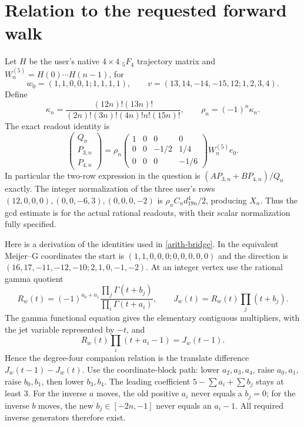 \documentclass[11pt]{article}
\begin{document}
\section{Relation to the requested forward walk}\label{arith-walk-section}
Let $H$ be the user's native $4\times4$ ${}_5F_4$ trajectory matrix and
$W_n^{(5)}=H(0)\cdots H(n-1)$, for
\[
 w_0=(1,1,0,0,1;1,1,1,1),\qquad
 v=(13,14,-14,-15,12;1,2,3,4).
\]
Define
\[
 \kappa_n=\frac{(12n)!(13n)!}
 {(2n)!(3n)!(4n)!n!(15n)!},\qquad \rho_n=(-1)^n\kappa_n.
\]
The exact readout identity is
\begin{equation}\label{arith-bridge}
 \begin{pmatrix}Q_n\\P_{3,n}\\P_{4,n}\end{pmatrix}
 =\rho_n
 \begin{pmatrix}1&0&0&0\\0&0&-1/2&1/4\\0&0&0&-1/6\end{pmatrix}
 W_n^{(5)}e_0.
\end{equation}
In particular the two-row expression in the question is
$(AP_{3,n}+BP_{4,n})/Q_n$ exactly. The integer normalization of the
three user's rows $(12,0,0,0),(0,0,-6,3),(0,0,0,-2)$ is
$\rho_n C_nd_{19n}^4/2$, producing $X_n$.
Thus the gcd estimate is for the actual rational readouts, with their
scalar normalization fully specified.

Here is a derivation of the identities used in \eqref{arith-bridge}. In the
equivalent Meijer--G coordinates the start is
$(1,1,0,0,0;0,0,0,0,0)$ and the direction is
$(16,17,-11,-12,-10;2,1,0,-1,-2)$.
At an integer vertex use the rational gamma quotient
\[
 R_w(t)=(-1)^{a_0+a_1}\frac{\prod_j\Gamma(t+b_j)}{\prod_i\Gamma(t+a_i)},
 \qquad J_w(t)=R_w(t)\prod_j(t+b_j).
\]
The gamma functional equation gives the elementary contiguous
multipliers, with the jet variable represented by $-t$, and
\[
 R_w(t)\prod_i(t+a_i-1)=J_w(t-1).
\]
Hence the degree-four companion relation is the translate difference
$J_w(t-1)-J_w(t)$.
Use the coordinate-block path: lower $a_2,a_3,a_4$, raise $a_0,a_1$,
raise $b_0,b_1$, then lower $b_3,b_4$. The leading coefficient
$5-\sum a_i+\sum b_j$ stays at least $3$. For the inverse $a$ moves,
the old positive $a_i$ never equals a $b_j=0$; for the inverse $b$ moves,
the new $b_j\in[-2n,-1]$ never equals an $a_i-1$.
All required inverse generators therefore exist.
\end{document}
